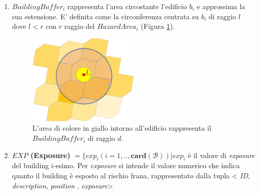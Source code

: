 \begin{enumerate}
	\item \textit{$BuildingBuffer_i$} rappresenta l'area circostante l'edificio $b_i$ e approssima la sua estensione. E' definita come la circonferenza centrata su $b_i$ di raggio $l$ dove $l < r $ con $r$ raggio del \textit{$HazardArea_i$} (Figura \ref{buildingimpactfactor}).
	
	\begin{figure}[h]
		\centering
		\includegraphics[width=0.5\textwidth]{images/buildingimpactfactor}
		\caption{L'area di colore in giallo intorno all'edificio rappresenta il $BuildingBuffer_i$ di raggio $d$.}
		\label{buildingimpactfactor}
	\end{figure}
	
	\item \label{last_enum} \textbf{$EXP$ (Exposure)} $ = \{exp_i(i=1,..,\mathbf{card}(\mathcal{B})) | exp_i $ è il valore di \textit{exposure} del building i-esimo. Per \textit{exposure} si intende il valore numerico che indica quanto il building è esposto al rischio frana, 
	rappresentato dalla tupla < \textit{ID}, \textit{description}, \textit{position} , \textit{exposure}> 
	
\end{enumerate}
